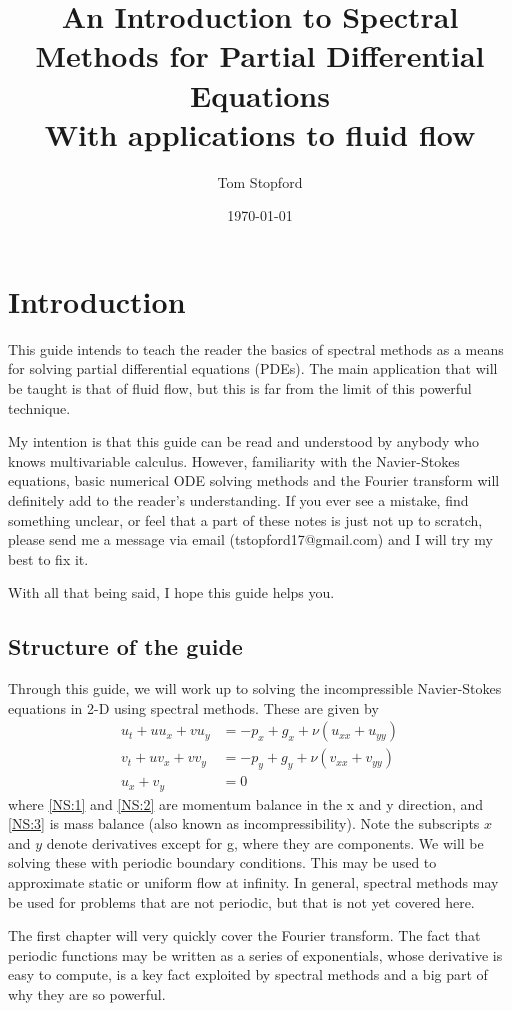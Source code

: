 \documentclass[a4paper,11pt]{article}
\title{An Introduction to Spectral Methods for Partial Differential Equations \\ \large With applications to fluid flow}
\author{Tom Stopford}
\date{\today}
\theoremstyle{plain} %
\theoremstyle{remark}
\theoremstyle{definition} %
\begin{document}
  

\maketitle

\section{Introduction}
This guide intends to teach the reader the basics of spectral methods as a means for solving partial differential equations (PDEs). The main application that will be taught is that of fluid flow, but this is far from the limit of this powerful technique. 

My intention is that this guide can be read and understood by anybody who knows multivariable calculus. However, familiarity with the Navier-Stokes equations, basic numerical ODE solving methods and the Fourier transform will definitely add to the reader's understanding. If you ever see a mistake, find something unclear, or feel that a part of these notes is just not up to scratch, please send me a message via email (tstopford17@gmail.com) and I will try my best to fix it. 

With all that being said, I hope this guide helps you.

\subsection{Structure of the guide}
Through this guide, we will work up to solving the incompressible Navier-Stokes equations in 2-D using spectral methods. These are given by
\begin{align}
\label{NS:1}u_t+u u_x+v u_y &= -p_x + g_x + \nu \left(u_{xx}+u_{yy}\right)\\ 
\label{NS:2}v_t+u v_x+v v_y &= -p_y + g_y + \nu \left(v_{xx}+v_{yy}\right) \\ 
\label{NS:3}u_x+v_y&=0 
\end{align}
where \ref{NS:1} and \ref{NS:2} are momentum balance in the x and y direction, and \ref{NS:3} is mass balance (also known as incompressibility). Note the subscripts $x$ and $y$ denote derivatives except for g, where they are components. We will be solving these with periodic boundary conditions. This may be used to approximate static or uniform flow at infinity. In general, spectral methods may be used for problems that are not periodic, but that is not yet covered here.

The first chapter will very quickly cover the Fourier transform. The fact that periodic functions may be written as a series of exponentials, whose derivative is easy to compute, is a key fact exploited by spectral methods and a big part of why they are so powerful.
\end{document}
